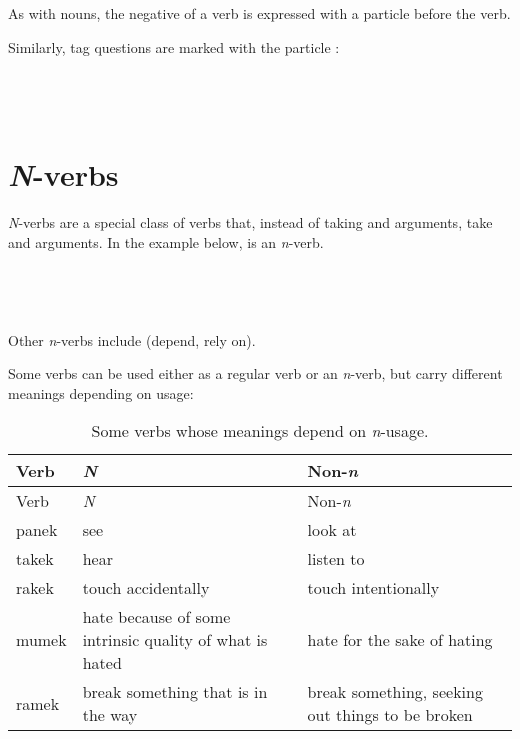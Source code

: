 \documentclass{book}
\begin{document}
As with nouns, the negative of a verb is expressed with a particle  before the verb.

Similarly, tag questions are marked with the particle : \\
~\\
   \\
   \\
  

\section{\emph{N}-verbs}

\emph{N}-verbs are a special class of verbs that, instead of taking  and  arguments, take  and  arguments. In the example below,  is an \emph{n}-verb. \\
~\\
    \\
    \\
\emph{   } \\

Other \emph{n}-verbs include  (depend, rely on).

Some verbs can be used either as a regular verb or an \emph{n}-verb, but carry different meanings depending on usage:

\begin{longtabu} to \linewidth {|l|Y|Y|}
    \caption{Some verbs whose meanings depend on \emph{n}-usage.} \\
    
    \hline
    Verb & \emph{N} & Non-\emph{n} \\
    \hline
    \endfirsthead
    
    \hline
    Verb & \emph{N} & Non-\emph{n} \\
    \hline
    \endhead
    
    \hline
    \endfoot
    
    \hline
    \endlastfoot
    
    panek & see & look at \\
    takek & hear & listen to \\
    rakek & touch accidentally & touch intentionally \\
    mumek & hate because of some intrinsic quality of what is hated & hate for the sake of hating \\
    ramek & break something that is in the way & break something, seeking out things to be broken \\
\end{longtabu}
\end{document}

